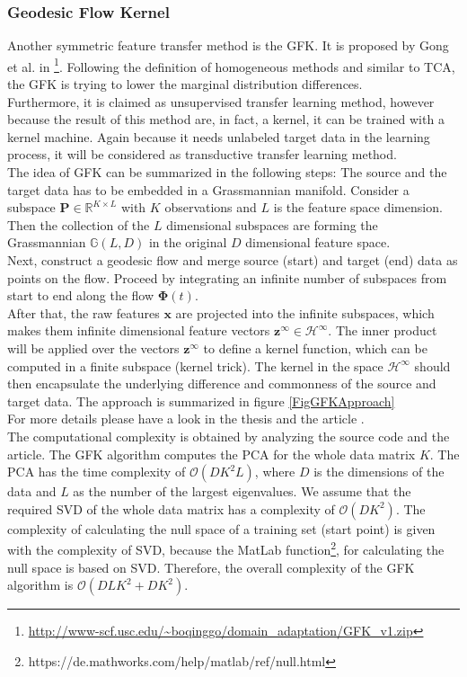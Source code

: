 \subsubsection{Geodesic Flow Kernel}
Another symmetric feature transfer method is the \ac{GFK}. 
It is proposed by Gong et al. in \cite{Gong.}\footnote{\url{http://www-scf.usc.edu/~boqinggo/domain\_adaptation/GFK\_v1.zip}}.
Following the definition of homogeneous methods and similar to \acs{TCA}, the \acl{GFK} is trying to lower the marginal distribution differences.\cite[p. 13]{Weiss.2016}\\
Furthermore, it is claimed as unsupervised transfer learning method, however because the result of this method are, in fact, a kernel, it can be trained with a kernel machine.\cite{Gong.}
Again because it needs unlabeled target data in the learning process, it will be considered as transductive transfer learning method.\\
The idea of \acs{GFK} can be summarized in the following steps:
The source and the target data has to be embedded in a Grassmannian manifold.
Consider a subspace $\mathbf{P} \in \mathbb{R}^{K \times L}$ with $K$ observations and $L$ is the feature space dimension.
Then the collection of the $L$ dimensional subspaces are forming the Grassmannian $\mathbb{G}(L, D)$ in the original $D$ dimensional feature space.\cite{Gong.}\\
Next, construct a geodesic flow and merge source (start) and target (end) data as points on the flow.
Proceed by integrating an infinite number of subspaces from start to end along the flow $\boldsymbol{\Phi}(t)$.\cite{Gong.}\\
After that, the raw features $\mathbf{x}$ are projected into the infinite subspaces, which makes them infinite dimensional feature vectors $\mathbf{z}^\infty \in \mathcal{H}^\infty$.
The inner product will be applied over the vectors $\mathbf{z}^\infty$ to define a kernel function, which can be computed in a finite subspace (kernel trick).
The kernel in the space $\mathcal{H}^\infty$ should then encapsulate the underlying difference and commonness of the source and target data.\cite{Gong.} The approach is summarized in figure \ref{FigGFKApproach}\\
For more details please have a look in the thesis \cite[p. 45;110-113]{Gong.2015} and the article \cite{Gong.}.\\
The computational complexity is obtained by analyzing the source code and the article.
The \acs{GFK} algorithm computes the \acs{PCA} for the whole data matrix $K$. The \acs{PCA} has the time complexity of $\mathcal{O}(DK^2L)$, where $D$ is the dimensions of the data and $L$ as the number of the largest eigenvalues.\cite[p. 563]{Bishop.2009} We assume that the required \acs{SVD} of the whole data matrix has a complexity of $\mathcal{O}(DK^2)$. The complexity of calculating the null space of a training set (start point) is given with the complexity of \acs{SVD}, because the MatLab function\footnote{https://de.mathworks.com/help/matlab/ref/null.html}, for calculating the null space is based on \acs{SVD}. Therefore, the overall complexity of the \acs{GFK} algorithm is $\mathcal{O}(DLK^2+DK^2)$.

